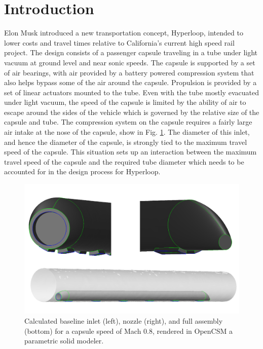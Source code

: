 \documentclass[heading.tex]{subfiles}
\begin{document}
\section{Introduction}

Elon Musk introduced a new transportation concept, Hyperloop, intended to lower costs and travel times relative to California's current high speed rail project.\cite{Musk} The design consists of a passenger capsule traveling in a tube under light vacuum at ground level and near sonic speeds. The capsule is supported by a set of air bearings, with air provided by a battery powered compression system that also helps bypass some of the air around the capsule. Propulsion is provided by a set of linear actuators mounted to the tube. Even with the tube mostly evacuated under light vacuum, the speed of the capsule is limited by the ability of air to escape around the sides of the vehicle which is governed by the relative size of the capsule and tube. The compression system on the capsule requires a fairly large air intake at the nose of the capsule, show in Fig. \ref{f:hyperloopCAD}. The diameter of this inlet, and hence the diameter of the capsule, is strongly tied to the maximum travel speed of the capsule. This situation sets up an interaction between the maximum travel speed of the capsule and the required tube diameter which needs to be accounted for in the design process for Hyperloop. 

\begin{figure}[hbtp]
\centering
\includegraphics[scale=0.25]{images/hyperloop_cad.png}
\caption{Calculated baseline inlet (left), nozzle (right), and full assembly (bottom) for a capsule speed of Mach 0.8, rendered in OpenCSM a parametric solid modeler. \label{f:hyperloopCAD}}
\end{figure}
\end{document}
